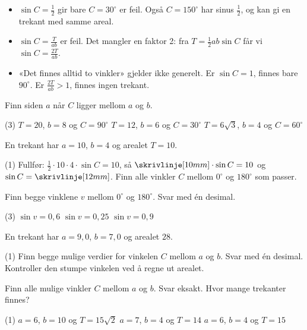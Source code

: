 \begin{vanligfeil}
\begin{itemize}[leftmargin=1.2em,itemsep=1pt,topsep=0pt]
  \item $\sin C = \frac12$ gir bare $C = 30^\circ$ er feil. Også $C = 150^\circ$ har sinus $\frac12$, og kan gi en trekant med samme areal.
  \item $\sin C = \frac{T}{ab}$ er feil. Det mangler en faktor 2: fra $T = \frac12 ab\sin C$ får vi $\sin C = \frac{2T}{ab}$.
  \item «Det finnes alltid to vinkler» gjelder ikke generelt. Er $\sin C = 1$, finnes bare $90^\circ$. Er $\frac{2T}{ab} > 1$, finnes ingen trekant.
\end{itemize}
\end{vanligfeil}


Finn siden $a$ når $C$ ligger mellom $a$ og $b$.
\begin{tasks}(3)
  \task $T = 20$, $b = 8$ og $C = 90^\circ$
  \task $T = 12$, $b = 6$ og $C = 30^\circ$
  \task $T = 6\sqrt3$, $b = 4$ og $C = 60^\circ$
\end{tasks}

En trekant har $a = 10$, $b = 4$ og arealet $T = 10$.
\begin{tasks}(1)
  \task Fullfør: $\frac12 \cdot 10 \cdot 4 \cdot \sin C = 10$, så $\skrivlinje[10mm] \cdot \sin C = 10$ og $\sin C = \skrivlinje[12mm]$.
  \task Finn alle vinkler $C$ mellom $0^\circ$ og $180^\circ$ som passer.
\end{tasks}

Finn begge vinklene $v$ mellom $0^\circ$ og $180^\circ$. Svar med én desimal.
\begin{tasks}(3)
  \task $\sin v = 0{,}6$
  \task $\sin v = 0{,}25$
  \task $\sin v = 0{,}9$
\end{tasks}


En trekant har $a = 9{,}0$, $b = 7{,}0$ og arealet $28$.
\begin{tasks}(1)
  \task Finn begge mulige verdier for vinkelen $C$ mellom $a$ og $b$. Svar med én desimal.
  \task Kontroller den stumpe vinkelen ved å regne ut arealet.
\end{tasks}

Finn alle mulige vinkler $C$ mellom $a$ og $b$. Svar eksakt. Hvor mange trekanter finnes?
\begin{tasks}(1)
  \task $a = 6$, $b = 10$ og $T = 15\sqrt2$
  \task $a = 7$, $b = 4$ og $T = 14$
  \task $a = 6$, $b = 4$ og $T = 15$
\end{tasks}

